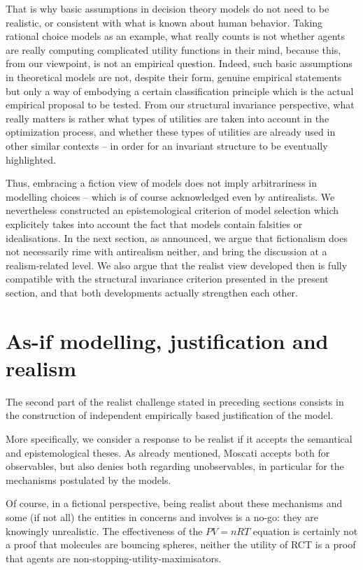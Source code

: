 \documentclass[a4paper,11pt]{article}
\theoremstyle{definition}
\begin{document}
That is why basic assumptions in decision theory models do not need to be realistic, or consistent with what is known about human behavior. Taking rational choice models as an example, what really counts is not whether agents are really computing complicated utility functions in their mind, because this, from our viewpoint, is not an empirical question. Indeed, such basic assumptions in theoretical models are not, despite their form, genuine empirical statements but only a way of embodying a certain classification principle which is the actual empirical proposal to be tested. From our structural invariance perspective, what really matters is rather what types of utilities are taken into account in the optimization process, and whether these types of utilities are already used in other similar contexts -- in order for an invariant structure to be eventually highlighted. 

Thus, embracing a fiction view of models does not imply arbitrariness in modelling choices -- which is of course acknowledged even by antirealists. We nevertheless constructed an epistemological criterion of model selection which explicitely takes into account the fact that models contain falsities or idealisations. In the next section, as announced, we argue that fictionalism does not necessarily rime with antirealism neither, and bring the discussion at a realism-related level. We also argue that the realist view developed then is fully compatible with the structural invariance criterion presented in the present section, and that both developments actually strengthen each other.

\section{As-if modelling, justification and realism}
\label{sec:asif_realism}

The second part of the realist challenge stated in preceding sections consists in the construction of independent empirically based justification of the model.

More specifically, we consider a response to be realist if it accepts the semantical and epistemological theses. As already mentioned, Moscati accepts both for observables, but also denies both regarding unobservables, in particular for the mechanisms postulated by the models.

Of course, in a fictional perspective, being realist about these mechanisms and some (if not all) the entities in concerns and involves is a no-go: they are knowingly unrealistic. The effectiveness of the $PV=nRT$ equation is certainly not a proof that molecules are bouncing spheres, neither the utility of RCT is a proof that agents are non-stopping-utility-maximisators.
\end{document}
